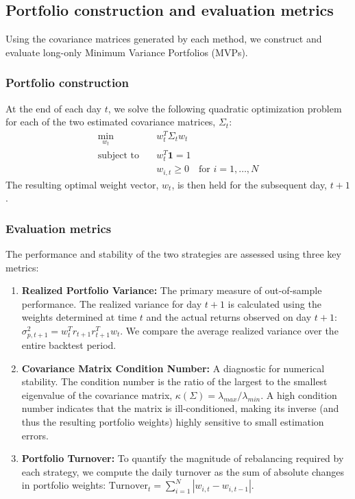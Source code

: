 \documentclass[]{article}
\begin{document}
\subsection{Portfolio construction and evaluation metrics}
Using the covariance matrices generated by each method, we construct and evaluate long-only Minimum Variance Portfolios (MVPs).

\subsubsection{Portfolio construction}
At the end of each day $t$, we solve the following quadratic optimization problem for each of the two estimated covariance matrices, $\Sigma_t$:
\begin{align}
\min_{w_t} \quad & w_t^T \Sigma_t w_t \\
\text{subject to} \quad & w_t^T \mathbf{1} = 1 \\
& w_{i,t} \ge 0 \quad \text{for } i=1, \dots, N
\end{align}
The resulting optimal weight vector, $w_t$, is then held for the subsequent day, $t+1$.

\subsubsection{Evaluation metrics}
The performance and stability of the two strategies are assessed using three key metrics:
\begin{enumerate}
    \item \textbf{Realized Portfolio Variance:} The primary measure of out-of-sample performance. The realized variance for day $t+1$ is calculated using the weights determined at time $t$ and the actual returns observed on day $t+1$: $\sigma^2_{p, t+1} = w_t^T r_{t+1} r_{t+1}^T w_t$. We compare the average realized variance over the entire backtest period.
    \item \textbf{Covariance Matrix Condition Number:} A diagnostic for numerical stability. The condition number is the ratio of the largest to the smallest eigenvalue of the covariance matrix, $\kappa(\Sigma) = \lambda_{max} / \lambda_{min}$. A high condition number indicates that the matrix is ill-conditioned, making its inverse (and thus the resulting portfolio weights) highly sensitive to small estimation errors.
    \item \textbf{Portfolio Turnover:} To quantify the magnitude of rebalancing required by each strategy, we compute the daily turnover as the sum of absolute changes in portfolio weights: $\text{Turnover}_t = \sum_{i=1}^{N} |w_{i,t} - w_{i,t-1}|$.
\end{enumerate}
\end{document}

